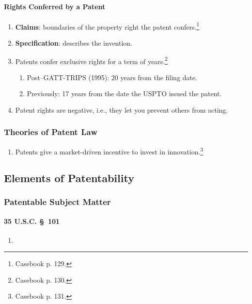 \paragraph{Rights Conferred by a Patent}

\begin{enumerate}
    \item \textbf{Claims}: boundaries of the property right the patent 
    confers.\footnote{Casebook p. 129.}
    \item \textbf{Specification}: describes the invention.
    \item Patents confer exclusive rights for a term of years.\footnote{Casebook 
    p. 130.}
    \begin{enumerate}
        \item Post--GATT-TRIPS (1995): 20 years from the filing date.
        \item Previously: 17 years from the date the USPTO issued the patent.
    \end{enumerate}
    \item Patent rights are negative, i.e., they let you prevent others from 
    acting.
\end{enumerate}

\subsubsection{Theories of Patent Law}

\begin{enumerate}
    \item Patents give a market-driven incentive to invest in 
    innovation.\footnote{Casebook p. 131.}
\end{enumerate}

\subsection{Elements of Patentability}

\subsubsection{Patentable Subject Matter}

\paragraph{35 U.S.C. \S\ 101} %

\begin{enumerate}
    \item 
\end{enumerate}

